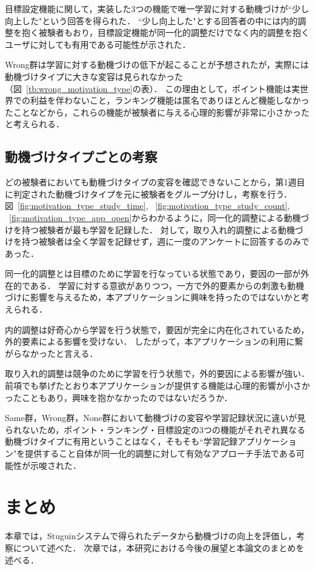 目標設定機能に関して，実装した3つの機能で唯一学習に対する動機づけが``少し向上した"という回答を得られた．
``少し向上した"とする回答者の中には内的調整を抱く被験者もおり，目標設定機能が同一化的調整だけでなく内的調整を抱くユーザに対しても有用である可能性が示された．

Wrong群は学習に対する動機づけの低下が起こることが予想されたが，実際には動機づけタイプに大きな変容は見られなかった（図~\ref{tb:wrong_motivation_type}の表）．
この理由として，ポイント機能は実世界での利益を伴わないこと，ランキング機能は匿名でありほとんど機能しなかったことなどから，これらの機能が被験者に与える心理的影響が非常に小さかったと考えられる．

\subsection{動機づけタイプごとの考察}
どの被験者においても動機づけタイプの変容を確認できないことから，第1週目に判定された動機づけタイプを元に被験者をグループ分けし，考察を行う．
図~\ref{fig:motivation_type_study_time}, ~\ref{fig:motivation_type_study_count}, ~\ref{fig:motivation_type_app_open}からわかるように，同一化的調整による動機づけを持つ被験者が最も学習を記録した．
対して，取り入れ的調整による動機づけを持つ被験者は全く学習を記録せず，週に一度のアンケートに回答するのみであった．

同一化的調整とは目標のために学習を行なっている状態であり，要因の一部が外在的である．
学習に対する意欲がありつつ，一方で外的要素からの刺激も動機づけに影響を与えるため，本アプリケーションに興味を持ったのではないかと考えられる．

内的調整は好奇心から学習を行う状態で，要因が完全に内在化されているため，外的要素による影響を受けない．
したがって，本アプリケーションの利用に繋がらなかったと言える．

取り入れ的調整は競争のために学習を行う状態で，外的要因による影響が強い．
前項でも挙げたとおり本アプリケーションが提供する機能は心理的影響が小さかったこともあり，興味を抱かなかったのではないだろうか．

Same群，Wrong群，None群において動機づけの変容や学習記録状況に違いが見られないため，ポイント・ランキング・目標設定の3つの機能がそれぞれ異なる動機づけタイプに有用ということはなく，そもそも``学習記録アプリケーション"を提供すること自体が同一化的調整に対して有効なアプローチ手法である可能性が示唆された．

\section{まとめ}
本章では，Stuguinシステムで得られたデータから動機づけの向上を評価し，考察について述べた．
次章では，本研究における今後の展望と本論文のまとめを述べる．
